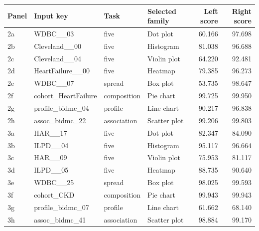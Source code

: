 \begin{longtable}{lllp{3cm}rr}\toprule
Panel & Input key & Task & Selected family & Left score & Right score\\\midrule\endhead
2a & WDBC\_\_03 & five & Dot plot & 60.166 & 97.698\\
2b & Cleveland\_\_00 & five & Histogram & 81.038 & 96.688\\
2c & Cleveland\_\_04 & five & Violin plot & 64.220 & 92.481\\
2d & HeartFailure\_\_00 & five & Heatmap & 79.385 & 96.273\\
2e & WDBC\_\_07 & spread & Box plot & 53.735 & 98.647\\
2f & cohort\_HeartFailure & composition & Pie chart & 99.725 & 99.950\\
2g & profile\_bidmc\_04 & profile & Line chart & 90.217 & 96.838\\
2h & assoc\_bidmc\_22 & association & Scatter plot & 99.206 & 99.803\\
3a & HAR\_\_17 & five & Dot plot & 82.347 & 84.090\\
3b & ILPD\_\_04 & five & Histogram & 95.117 & 96.664\\
3c & HAR\_\_09 & five & Violin plot & 75.953 & 81.117\\
3d & ILPD\_\_05 & five & Heatmap & 88.735 & 90.640\\
3e & WDBC\_\_25 & spread & Box plot & 98.025 & 99.593\\
3f & cohort\_CKD & composition & Pie chart & 99.943 & 99.943\\
3g & profile\_bidmc\_07 & profile & Line chart & 61.662 & 68.140\\
3h & assoc\_bidmc\_41 & association & Scatter plot & 98.884 & 99.170\\
\bottomrule\end{longtable}